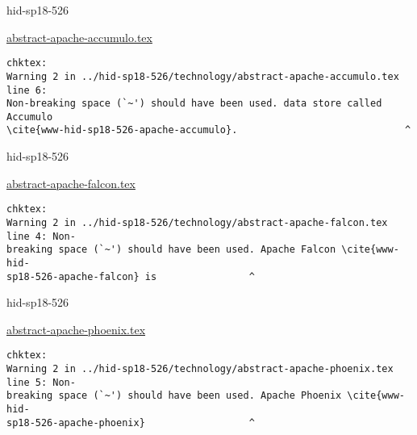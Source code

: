 

\begin{IU}

hid-sp18-526

\href{https://github.com/cloudmesh-community/hid-sp18-526/blob/master//technology/abstract-apache-accumulo.tex}{abstract-apache-accumulo.tex}

\begin{tiny}
\begin{verbatim}
chktex:
Warning 2 in ../hid-sp18-526/technology/abstract-apache-accumulo.tex line 6:
Non-breaking space (`~') should have been used. data store called Accumulo
\cite{www-hid-sp18-526-apache-accumulo}.                             ^
\end{verbatim}
\end{tiny}
\end{IU}



\begin{IU}

hid-sp18-526

\href{https://github.com/cloudmesh-community/hid-sp18-526/blob/master//technology/abstract-apache-falcon.tex}{abstract-apache-falcon.tex}

\begin{tiny}
\begin{verbatim}
chktex:
Warning 2 in ../hid-sp18-526/technology/abstract-apache-falcon.tex line 4: Non-
breaking space (`~') should have been used. Apache Falcon \cite{www-hid-
sp18-526-apache-falcon} is                ^
\end{verbatim}
\end{tiny}
\end{IU}



\begin{IU}

hid-sp18-526

\href{https://github.com/cloudmesh-community/hid-sp18-526/blob/master//technology/abstract-apache-phoenix.tex}{abstract-apache-phoenix.tex}

\begin{tiny}
\begin{verbatim}
chktex:
Warning 2 in ../hid-sp18-526/technology/abstract-apache-phoenix.tex line 5: Non-
breaking space (`~') should have been used. Apache Phoenix \cite{www-hid-
sp18-526-apache-phoenix}                  ^
\end{verbatim}
\end{tiny}
\end{IU}

